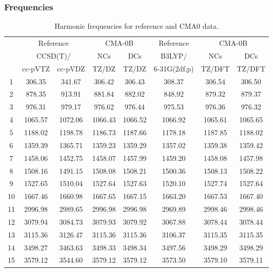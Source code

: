 \documentclass[10pt,oneside]{article}
\begin{document}
\clearpage

\subsubsection*{Frequencies}
\begin{table}[h!]
\centering
\caption{Harmonic frequencies for reference and CMA0 data.}
\begin{tabular}{cccccccc}
\toprule
{} & \multicolumn{2}{c}{Reference} & \multicolumn{2}{c}{CMA-0B} &    Reference & \multicolumn{2}{c}{CMA-0B} \\
{} & \multicolumn{2}{c}{CCSD(T)/} &     NCs &     DCs &       B3LYP/ &     NCs &     DCs \\
{} &   cc-pVTZ & cc-pVDZ &   TZ/DZ &   TZ/DZ & 6-31G(2df,p) &  TZ/DFT &  TZ/DFT \\
\midrule
1  &    306.35 &  341.67 &  306.42 &  306.43 &       308.37 &  306.54 &  306.50 \\
2  &    878.35 &  913.91 &  881.84 &  882.02 &       848.92 &  879.32 &  879.37 \\
3  &    976.31 &  979.17 &  976.62 &  976.44 &       975.53 &  976.36 &  976.32 \\
4  &   1065.57 & 1072.06 & 1066.43 & 1066.52 &      1066.92 & 1065.61 & 1065.65 \\
5  &   1188.02 & 1198.78 & 1186.73 & 1187.66 &      1178.18 & 1187.85 & 1188.02 \\
6  &   1359.39 & 1365.71 & 1359.23 & 1359.29 &      1357.02 & 1359.38 & 1359.42 \\
7  &   1458.06 & 1452.75 & 1458.07 & 1457.99 &      1459.20 & 1458.08 & 1457.98 \\
8  &   1508.16 & 1491.15 & 1508.08 & 1508.21 &      1500.36 & 1508.13 & 1508.22 \\
9  &   1527.65 & 1510.04 & 1527.64 & 1527.63 &      1520.10 & 1527.74 & 1527.64 \\
10 &   1667.46 & 1660.98 & 1667.65 & 1667.15 &      1663.20 & 1667.53 & 1667.40 \\
11 &   2996.98 & 2989.65 & 2996.98 & 2996.98 &      2969.89 & 2998.46 & 2998.46 \\
12 &   3079.94 & 3084.73 & 3079.93 & 3079.92 &      3067.88 & 3078.44 & 3078.44 \\
13 &   3115.36 & 3126.47 & 3115.36 & 3115.36 &      3106.37 & 3115.35 & 3115.35 \\
14 &   3498.27 & 3463.63 & 3498.33 & 3498.34 &      3497.56 & 3498.29 & 3498.29 \\
15 &   3579.12 & 3544.60 & 3579.12 & 3579.12 &      3573.50 & 3579.10 & 3579.11 \\
\bottomrule
\end{tabular}
\end{table}
\end{document}
